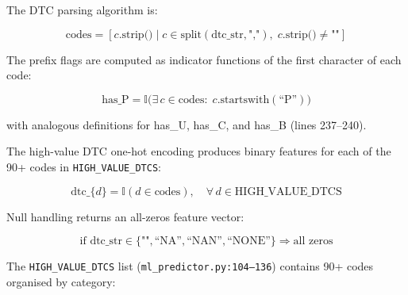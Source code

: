 \documentclass[10pt,a4paper]{article}
\begin{document}
The DTC parsing algorithm is:

\begin{equation}
\text{codes} = [c.\text{strip()} \mid c \in \text{split}(\text{dtc\_str}, \text{","}),\; c.\text{strip()} \neq \text{""}]
\label{eq:dtc-parse}
\end{equation}

The prefix flags are computed as indicator functions of the first character of each code:

\begin{equation}
\text{has\_P} = \mathbb{I}\big(\exists\, c \in \text{codes}:\; c.\text{startswith}(\text{``P''})\big)
\label{eq:has-p}
\end{equation}

with analogous definitions for has\_U, has\_C, and has\_B (lines 237--240).

The high-value DTC one-hot encoding produces binary features for each of the 90+ codes in \texttt{HIGH\_VALUE\_DTCS}:

\begin{equation}
\text{dtc\_}\{d\} = \mathbb{I}(d \in \text{codes}), \quad \forall\, d \in \text{HIGH\_VALUE\_DTCS}
\label{eq:dtc-onehot}
\end{equation}

Null handling returns an all-zeros feature vector:

\begin{equation}
\text{if dtc\_str} \in \{\text{""}, \text{``NA''}, \text{``NAN''}, \text{``NONE''}\} \Rightarrow \text{all zeros}
\label{eq:dtc-null}
\end{equation}

The \texttt{HIGH\_VALUE\_DTCS} list (\texttt{ml\_predictor.py:104--136}) contains 90+ codes organised by category:
\end{document}
